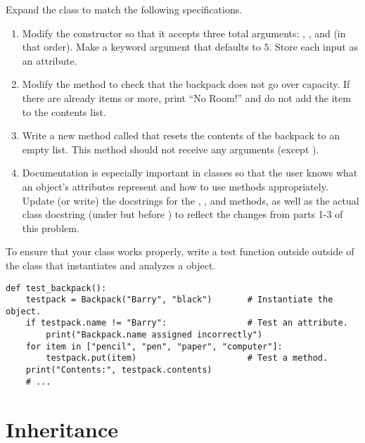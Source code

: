 \begin{problem} %
Expand the  class to match the following specifications.
\begin{enumerate}
\item Modify the constructor so that it accepts three total arguments: , , and  (in that order).
Make  a keyword argument that defaults to $5$.
Store each input as an attribute.

\item Modify the  method to check that the backpack does not go over capacity.
If there are already  items or more, print ``No Room!'' and do not add the item to the contents list.

\item Write a new method called  that resets the contents of the backpack to an empty list.
This method should not receive any arguments (except ).

\item Documentation is especially important in classes so that the user knows what an object's attributes represent and how to use methods appropriately.
Update (or write) the docstrings for the , , and  methods, as well as the actual class docstring (under  but before ) to reflect the changes from parts 1-3 of this problem.
\end{enumerate}

To ensure that your class works properly, write a test function outside outside of the  class that instantiates and analyzes a  object.
\begin{lstlisting}
def test_backpack():
    testpack = Backpack("Barry", "black")       # Instantiate the object.
    if testpack.name != "Barry":                # Test an attribute.
        print("Backpack.name assigned incorrectly")
    for item in ["pencil", "pen", "paper", "computer"]:
        testpack.put(item)                      # Test a method.
    print("Contents:", testpack.contents)
    # ...
\end{lstlisting}
\end{problem}

\section*{Inheritance} %

